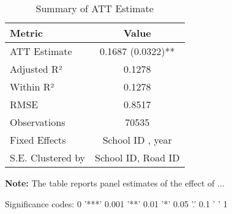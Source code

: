 \begin{table}[H]
\centering
\caption{Summary of ATT Estimate}
\label{tab:SA_math_100p}
 \begin{center}
 \begin{tabular}{lc}
 \toprule
Metric & Value \\
\midrule
ATT Estimate & 0.1687 (0.0322)** \\
\hline 
 Adjusted R² & 0.1278 \\
Within R² & 0.1278 \\
RMSE & 0.8517 \\
Observations & 70535 \\
\hline 
 Fixed Effects & School ID ,  year \\
S.E. Clustered by & School ID, Road ID \\
\bottomrule
\end{tabular}
 \end{center}\begin{tablenotes}
\small
\item \textbf{Note:} The table reports panel estimates of the effect of ...
\item Significance codes: 0 '***' 0.001 '**' 0.01 '*' 0.05 '.' 0.1 ' ' 1
\end{tablenotes}
\end{table}